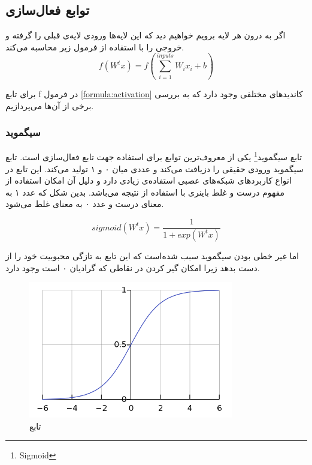 \documentclass[12pt, a4paper, oneside]{report}
\begin{document}
\subsection{توابع فعال‌سازی}

اگر به درون هر لایه برویم خواهیم دید که این لایه‌ها ورودی لایه‌ی قبلی را گرفته و خروجی را با استفاده از فرمول زیر
محاسبه می‌کند.
\begin{equation}
    f(W^tx)=f(\sum_{i=1}^{inputs} W_ix_i + b)
    \label{formula:activation}
\end{equation}

برای تابع
f
در فرمول
\ref{formula:activation}
کاندیدهای مختلفی وجود دارد که به بررسی برخی از آن‌ها می‌پردازیم.

\subsubsection{سیگموید}

تابع 
سیگموید\footnote{Sigmoid}
یکی از معروف‌ترین توابع برای استفاده جهت
تابع فعال‌سازی
‌است. تابع سیگموید ورودی حقیقی را دزیافت می‌کند و عددی میان ۰ و ۱ تولید می‌کند. این تابع در انواع کاربرد‌های شبکه‌‌های
عصبی استفاده‌ی زیادی دارد و دلیل آن امکان استفاده از مفهوم درست و غلط باینری با استفاده از نتیجه می‌باشد. بدین شکل که
عدد ۱ به معنای درست و عدد ۰ به معنای غلط می‌شود.

\begin{equation}
    sigmoid(W^tx) = \dfrac{1}{1 + exp(W^tx)}
\label{formula:sigmoid}
\end{equation}

اما غیر خطی بودن سیگموید
سبب شده‌است که این تابع به تازگی محبوبیت خود را از دست بدهد زیرا امکان گیر کردن در نقاطی که گرادیان ۰ است وجود دارد.

\begin{figure}[!ht]
    \centering
    \includegraphics[width=0.80\textwidth]{sigmoid}
    \caption{تابع }
    \label{fig:sigmoid}
\end{figure}
\end{document}
